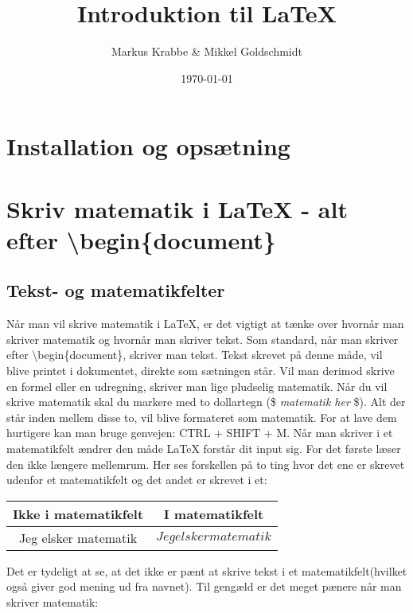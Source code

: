 \documentclass[titlepage]{article}
\title{Introduktion til \LaTeX{} }
\author{Markus Krabbe \& Mikkel Goldschmidt}
\date{\today}
\begin{document}
\maketitle

\tableofcontents
\clearpage

\section{Installation og opsætning}
\pagebreak

\section{Skriv matematik i \LaTeX{} - alt efter \textbackslash begin\{document\}}
\subsection{Tekst- og matematikfelter}
Når man vil skrive matematik i \LaTeX{}, er det vigtigt at tænke over hvornår man skriver matematik og hvornår man skriver tekst.
Som standard, når man skriver efter \textbackslash begin\{document\}, skriver man tekst. 
Tekst skrevet på denne måde, vil blive printet i dokumentet, direkte som sætningen står.
Vil man derimod skrive en formel eller en udregning, skriver man lige pludselig matematik.
Når du vil skrive matematik skal du markere med to dollartegn (\$ \textit{matematik her} \$).
Alt der står inden mellem disse to, vil blive formateret som matematik. 
For at lave dem hurtigere kan man bruge genvejen: CTRL + SHIFT + M.
Når man skriver i et matematikfelt ændrer den måde \LaTeX{} forstår dit input sig.
For det første læser den ikke længere mellemrum. 
Her ses forskellen på to ting hvor det ene er skrevet udenfor et matematikfelt og det andet er skrevet i et:
\bigskip

\begin{center}
\begin{tabular}{|c|c|}
	\hline Ikke i matematikfelt & I matematikfelt\\ \hline
	Jeg elsker matematik & $Jeg elsker matematik$ \\ \hline
\end{tabular}
\end{center}

Det er tydeligt at se, at det ikke er pænt at skrive tekst i et matematikfelt(hvilket også giver god mening ud fra navnet).
Til gengæld er det meget pænere når man skriver matematik:
\bigskip
\end{document}
